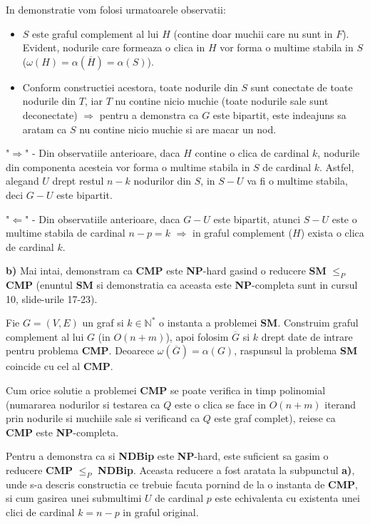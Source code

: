 \documentclass{article}
\begin{document}
In demonstratie vom folosi urmatoarele observatii:
\begin{itemize}
    \item $S$ este graful complement al lui $H$ (contine doar muchii care nu sunt in $F$). Evident, nodurile care formeaza o clica in $H$ vor forma o multime stabila in $S$ ($\omega(H) = \alpha(\overline{H}) = \alpha(S)$).
    \item Conform constructiei acestora, toate nodurile din $S$ sunt conectate de toate nodurile din $T$, iar $T$ nu contine nicio muchie (toate nodurile sale sunt deconectate) $\Rightarrow$ pentru a demonstra ca $G$ este bipartit, este indeajuns sa aratam ca $S$ nu contine nicio muchie si are macar un nod.
\end{itemize}

"$\Rightarrow$" - Din observatiile anterioare, daca $H$ contine o clica de cardinal $k$, nodurile din componenta acesteia vor forma o multime stabila in $S$ de cardinal $k$. Astfel, alegand $U$ drept restul $n-k$ nodurilor din $S$, in $S-U$ va fi o multime stabila, deci $G-U$ este bipartit.

"$\Leftarrow$" - Din observatiile anterioare, daca $G-U$ este bipartit, atunci $S-U$ este o multime stabila de cardinal $n-p = k$ $\Rightarrow$ in graful complement ($H$) exista o clica de cardinal $k$.

{\bf b)} Mai intai, demonstram ca {\bf CMP} este {\bf NP}-hard gasind o reducere {\bf SM} $\leq_P$ {\bf CMP} (enuntul {\bf SM} si demonstratia ca aceasta este {\bf NP}-completa sunt in cursul 10, slide-urile 17-23).

Fie $G=(V,E)$ un graf si $k \in \mathbb{N}^*$ o instanta a problemei {\bf SM}. Construim graful complement al lui $G$ (in $O(n+m)$), apoi folosim $\overline G$ si $k$ drept date de intrare pentru problema {\bf CMP}. Deoarece $\omega(\overline{G}) = \alpha(G)$, raspunsul la problema {\bf SM} coincide cu cel al {\bf CMP}.

Cum orice solutie a problemei {\bf CMP} se poate verifica in timp polinomial (numararea nodurilor si testarea ca $Q$ este o clica se face in $O(n + m)$ iterand prin nodurile si muchiile sale si verificand ca $Q$ este graf complet), reiese ca {\bf CMP} este {\bf NP}-completa.

Pentru a demonstra ca si {\bf NDBip} este {\bf NP}-hard, este suficient sa gasim o reducere {\bf CMP} $\leq_P$ {\bf NDBip}. Aceasta reducere a fost aratata la subpunctul {\bf a)}, unde s-a descris constructia ce trebuie facuta pornind de la o instanta de {\bf CMP}, si cum gasirea unei submultimi $U$ de cardinal $p$ este echivalenta cu existenta unei clici de cardinal $k=n-p$ in graful original.
\end{document}
